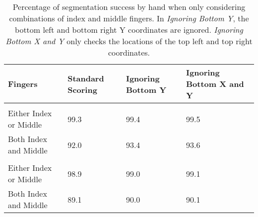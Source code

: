 \documentclass[]{article}
\begin{document}
\begin{table}[!h]

\caption{\label{tab:twoinch-per-hand-index-middle}Percentage of segmentation success by hand when only considering combinations of index and middle fingers. In \textit{Ignoring Bottom Y}, the bottom left and bottom right Y coordinates are ignored. \textit{Ignoring Bottom X and Y} only checks the locations of the top left and top right coordinates.}
\centering
\begin{tabular}{llll}
\toprule
Fingers & Standard Scoring & Ignoring Bottom Y & Ignoring Bottom X and Y\\
\midrule
\addlinespace[0.3em]
\multicolumn{4}{l}{\textbf{Right}}\\
\rowcolor{gray!6}  \hspace{1em}Either Index or Middle & 99.3 & 99.4 & 99.5\\
\hspace{1em}Both Index and Middle & 92.0 & 93.4 & 93.6\\
\addlinespace[0.3em]
\multicolumn{4}{l}{\textbf{Left}}\\
\rowcolor{gray!6}  \hspace{1em}Either Index or Middle & 98.9 & 99.0 & 99.1\\
\hspace{1em}Both Index and Middle & 89.1 & 90.0 & 90.1\\
\bottomrule
\end{tabular}
\end{table}
\end{document}
